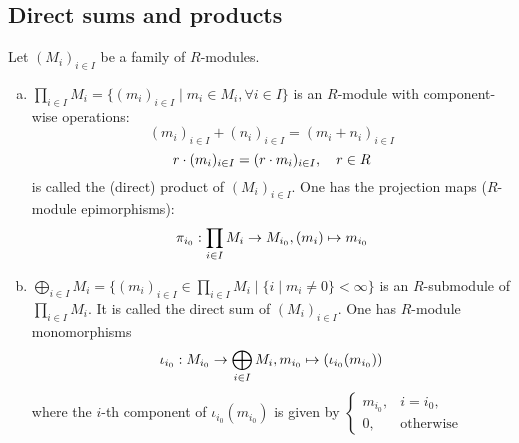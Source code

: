 \documentclass[a4paper]{report}
\begin{document}
\subsection*{Direct sums and products}
Let $(M_{i})_{i \in I}$ be a family of $R$-modules.
\begin{defi}
\begin{enumerate}[(a)]
  \item $\prod_{i \in I}M_{i} = \{(m_{i})_{i \in I} \mid m_{i} \in M_{i}, \forall i \in I\}$ is an $R$-module with component-wise operations:
        \[(m_{i})_{i \in I} + (n_{i})_{i \in I} =(m_{i}+n_{i})_{i \in I}\]
        \[r \cdot (m_{i})_{i \in I} = (r \cdot m_{i})_{i \in I}, \quad r \in R\]
        is called the (direct) product of $(M_{i})_{i \in I}$. One has the projection maps ($R$-module epimorphisms):\[\pi_{i_{0}}: \prod_{i \in I} M_{i} \to M_{i_{0}}, (m_{i}) \mapsto m_{i_{0}}\]
        \item $\bigoplus_{i \in I}M_{i} = \{(m_{i})_{i \in I} \in \prod_{i \in I} M_{i} \mid \{i \mid m_{i} \ne 0\} < \infty \}$ is an $R$-submodule of $\prod_{i \in I} M_{i}$. It is called the direct sum of $(M_{i})_{i \in I}$. One has $R$-module monomorphisms \[\iota_{i_{0}} : M_{i_{0}} \to \bigoplus_{i \in I} M_{i}, m_{i_{0}} \mapsto (\iota_{i_{0}}(m_{i_{0}}))\]
where the $i$-th component of $\iota_{i_{0}}(m_{i_{0}})$ is given by $\begin{cases} m_{i_{0}}, & i = i_{0}, \\ 0, & \text{otherwise}
\end{cases}$
\end{enumerate}
\end{defi}
\end{document}
